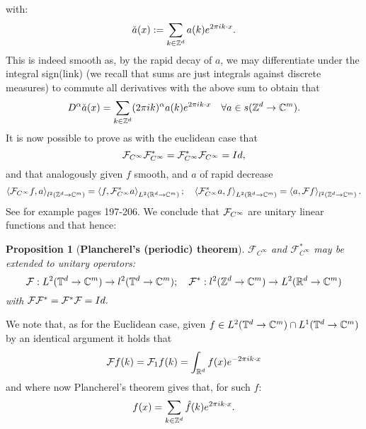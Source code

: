 \documentclass[12pt]{article}
\newtheorem{proposition}{Proposition}
\newcommand{\br}[1]{\left\langle#1\right\rangle}
\begin{document}
with:
\[\check{a}(x):=\sum_{k\in{\mathbb Z}^d}a(k)e^{2\pi ik\cdot x}.\]
This is indeed smooth as, by the rapid decay of $a$, we may  differentiate under the integral sign(link) (we recall that sums are just integrals against discrete measures) to commute all derivatives with the above sum to obtain that
\begin{equation}\label{dgivesrpft}
	D^\alpha \check{a}(x)=\sum_{k\in{\mathbb Z}^d}(2\pi ik)^\alpha a(k)e^{2\pi ik\cdot x}\quad\forall{a}\in {s({\mathbb Z}^d\to\mathbb{C}^m)}.
\end{equation}
It is now possible to prove as with the euclidean case that
\[\mathcal{F}_{C^\infty}\mathcal{F}^*_{C^\infty}=\mathcal{F}^*_{C^\infty}\mathcal{F}_{C^\infty}=Id,\]
and that analogously given $f$ smooth, and $a$ of rapid decrease
\[\br{\Ff_{C^\infty} f,a}_{l^2(\Z^d\to\C^m)}=\br{f,\Ff_{C^\infty}^*a}_{L^2(\R^d\to\C^m)};\quad\br{\Ff_{C^\infty}^* a,f}_{L^2(\R^d\to\C^m)}=\br{a,\Ff f}_{l^2(\Z^d\to\C^m)}.\]
See for example \cite{Tay} pages 197-206. We conclude that $\mathcal{F}_{C^\infty}$ are unitary linear functions and that hence:
\begin{proposition}[\textbf{Plancherel's (periodic) theorem}] \label{Plancherelperiodictheorem}
	$\mathcal{F}_{C^\infty}$ and $\mathcal{F}_{C^\infty}^*$ may be extended to unitary operators:
	\[\mathcal{F}:L^2({\mathbb T}^d\to\mathbb{C}^m)\to l^2({\mathbb T}^d\to\mathbb{C}^m);\quad \mathcal{F}^*:l^2({\mathbb Z}^d\to\mathbb{C}^m)\to L^2({\mathbb R}^d\to\mathbb{C}^m)\]
	with $\mathcal{F}\mathcal{F}^*=\mathcal{F}^*\mathcal{F}=Id.$
\end{proposition}
We note that, as for the Euclidean case, given $f\in L^2({\mathbb T}^d\to\mathbb{C}^m)\cap L^1({\mathbb T}^d\to\mathbb{C}^m)$ by an identical argument it holds that
\[\mathcal{F} f(k)=\mathcal{F}_1f(k)=\int_{{\mathbb R}^d}f(x)e^{-2\pi ik\cdot x}\]
and where now Plancherel's theorem gives that, for such $f$:
\begin{equation}\label{Plancerelpft}
	f(x)=\sum_{k\in{\mathbb Z}^d}\hat{f}(k)e^{2\pi ik\cdot x}.
\end{equation}
\end{document}
